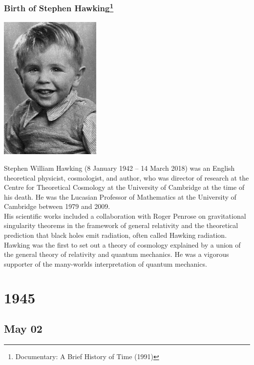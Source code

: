 \documentclass[11pt]{report}
\begin{document}
\subsection{Birth of Stephen Hawking\protect\footnote{Documentary: A Brief History of Time (1991)}}
\vspace{2mm}\begin{center}\includegraphics[width=5cm]{./img/youngHawking.jpg}\end{center}
Stephen William Hawking (8 January 1942 – 14 March 2018) was an English theoretical physicist, cosmologist, and author, who was director of research at the Centre for Theoretical Cosmology at the University of Cambridge at the time of his death. He was the Lucasian Professor of Mathematics at the University of Cambridge between 1979 and 2009.\\
His scientific works included a collaboration with Roger Penrose on gravitational singularity theorems in the framework of general relativity and the theoretical prediction that black holes emit radiation, often called Hawking radiation. Hawking was the first to set out a theory of cosmology explained by a union of the general theory of relativity and quantum mechanics. He was a vigorous supporter of the many-worlds interpretation of quantum mechanics.

\chapter{1945}
\section{May 02}
\end{document}
